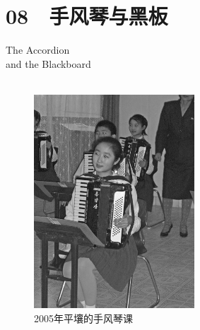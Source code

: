 \fancyhead[RO]{{\tiny{\textcolor{Gray}{\FA \ }}}\thepage}
\fancyhead[LE]{{\tiny{\textcolor{Gray}{\FA \ }}}\thepage}
\fancyfoot[LE,RO]{}
\fancyfoot[LO,CE]{}
\fancyfoot[CO,RE]{}
\chapter*{08 {\FA } 手风琴与黑板}
\vspace{5mm}
\begin{flushright}
	\textcolor{PinYinColor}{\EN \huge{The Accordion\\
		and the Blackboard\\
	\ \\}}
\end{flushright}

\begin{figure}[!htbp]
	\centering
	\includegraphics[width=6cm]{./Chapters/Images/08.jpg}
	\caption*{2005年平壤的手风琴课}
\end{figure}

